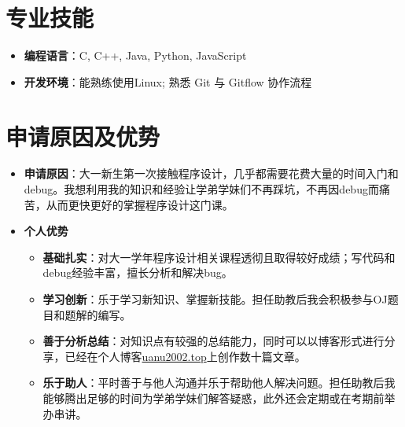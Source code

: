 \documentclass{resume}
\begin{document}
\section{专业技能}
\begin{itemize}
  \item \textbf{编程语言}：C, C++, Java, Python, JavaScript
  \item \textbf{开发环境}：能熟练使用Linux; 熟悉 Git 与 Gitflow 协作流程
\end{itemize}

\section{申请原因及优势}
\begin{itemize}
  \item \textbf{申请原因}：大一新生第一次接触程序设计，几乎都需要花费大量的时间入门和debug。我想利用我的知识和经验让学弟学妹们不再踩坑，不再因debug而痛苦，从而更快更好的掌握程序设计这门课。
  \item \textbf{个人优势}
    \begin{itemize}
      \item \textbf{基础扎实}：对大一学年程序设计相关课程透彻且取得较好成绩；写代码和debug经验丰富，擅长分析和解决bug。
	 \item \textbf{学习创新}：乐于学习新知识、掌握新技能。担任助教后我会积极参与OJ题目和题解的编写。
	 \item \textbf{善于分析总结}：对知识点有较强的总结能力，同时可以以博客形式进行分享，已经在个人博客\url{uanu2002.top}上创作数十篇文章。
	 \item \textbf{乐于助人}：平时善于与他人沟通并乐于帮助他人解决问题。担任助教后我能够腾出足够的时间为学弟学妹们解答疑惑，此外还会定期或在考期前举办串讲。
    \end{itemize}
\end{itemize}
\end{document}
